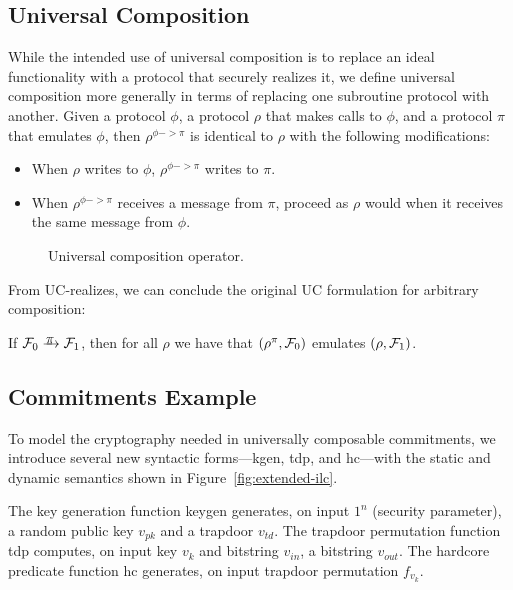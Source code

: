 \subsection{Universal Composition}
\label{subsec:composition}

While the intended use of universal composition is to replace an ideal
functionality with a protocol that securely realizes it, we define universal
composition more generally in terms of replacing one subroutine protocol with
another. Given a protocol $\phi$, a protocol $\rho$ that makes calls to $\phi$, and a
protocol $\pi$ that emulates $\phi$, then $\rho^{\phi -> \pi}$ is identical to $\rho$ with the
following modifications:
\begin{itemize}[leftmargin=*]
  \item When $\rho$ writes to $\phi$, $\rho^{\phi -> \pi}$ writes to $\pi$.
  \item When $\rho^{\phi -> \pi}$ receives a message from $\pi$, proceed as $\rho$ would when
    it receives the same message from $\phi$.
\end{itemize}

\begin{figure}

\caption{Universal composition operator.}
\label{fig:composition-operator}
\end{figure}

From UC-realizes, we can conclude the original UC formulation for arbitrary
composition:
\begin{theorem}
  If $\mc{F}_0 \yrightarrow{$\pi$} \mc{F}_1$, then for all $\rho$ we
  have that $(\rho^{\pi}, \mathcal{{F}}_0)$ emulates $(\rho, \mathcal{{F}}_1)$.
\end{theorem}

\subsection{Commitments Example}
\label{subsec:example}

To model the cryptography needed in universally composable commitments, we
introduce several new syntactic forms---\textsf{kgen}, \textsf{tdp}, and
\textsf{hc}---with the static and dynamic semantics shown in
Figure~\ref{fig:extended-ilc}.

The key generation function \textsf{keygen} generates, on input $1^n$ (security
parameter), a random public key $v_{pk}$ and a trapdoor $v_{td}$. The trapdoor
permutation function \textsf{tdp} computes, on input key $v_k$ and bitstring
$v_{in}$, a bitstring $v_{out}$. The hardcore predicate function \textsf{hc}
generates, on input trapdoor permutation $f_{v_k}$.

